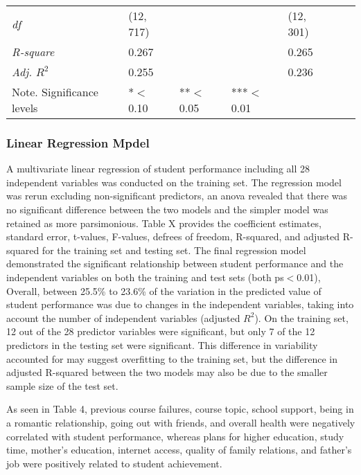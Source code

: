 \documentclass[sigconf]{acmart}
\begin{document}
\begin{table*}[ht]
\begin{tabular}{lllllll}
    \textit{df}         & (12, 717)          &       &        &         (12, 301)   &       &       \\
    \textit{R-square}   &      0.267         &       &        &         0.265       &       &       \\ 
    \textit{Adj. $R^2$} &   0.255            &       &        &         0.236       &       &       \\
    \bottomrule
    Note. Significance levels & *$<$0.10      & **$<$0.05  & ***$<$0.01 & & &
  \end{tabular}
\end{table*}



\subsubsection{Linear Regression Mpdel}

A multivariate linear regression of student performance including all 28 
independent variables was conducted on the training set. The regression model 
was rerun excluding non-significant predictors, an anova revealed that there 
was no significant difference between the two models and the simpler model
was retained as more parsimonious. Table X provides the coefficient estimates, 
standard error, t-values, F-values, defrees of freedom, R-squared, and adjusted 
R-squared for the training set and testing set. The final regression model
demonstrated the significant relationship between student performance and the 
independent variables on both the training and test sets (both ps$<$0.01),
Overall, between 25.5\% to 23.6\% of the variation in the predicted value of 
student performance was due to changes in the independent variables, taking 
into account the number of independent variables (adjusted $R^2$). On the 
training set, 12 out of the 28 predictor variables were significant, but
only 7 of the 12 predictors in the testing set were significant. This 
difference in variability accounted for may suggest overfitting to the 
training set, but the difference in adjusted R-squared between the two 
models may also be due to the smaller sample size of the test set. 


As seen in Table 4, previous course failures, course topic, school support, 
being in a romantic relationship, going out with friends, and overall health
were negatively correlated with student performance, whereas plans for higher 
education, study time, mother's education, internet access, quality of family 
relations, and father's job were positively related to student achievement. 
\end{document}
